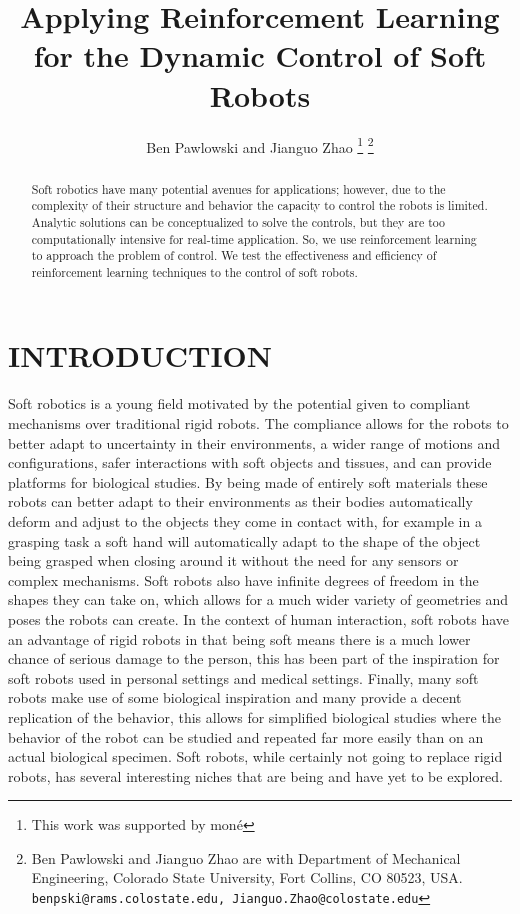 \documentclass[letterpaper, 10 pt, conference]{ieeeconf}  %
\title{\LARGE \bf
Applying Reinforcement Learning for the Dynamic Control of Soft Robots
}
\author{Ben Pawlowski and Jianguo Zhao%
\thanks{This work was supported by mon\'e}%
\thanks{Ben Pawlowski and Jianguo Zhao are with Department of Mechanical Engineering, Colorado State University, Fort Collins, CO 80523, USA.  {\tt\small benpski@rams.colostate.edu,  Jianguo.Zhao@colostate.edu}}%
}
\begin{document}
\maketitle
\thispagestyle{empty}
\pagestyle{empty}


\begin{abstract}

Soft robotics have many potential avenues for applications; however, due to the complexity of their structure and behavior the capacity to control the robots is limited. Analytic solutions can be conceptualized to solve the controls, but they are too computationally intensive for real-time application. So, we use reinforcement learning to approach the problem of control. We test the effectiveness and efficiency of reinforcement learning techniques to the control of soft robots.

\end{abstract}


\section{INTRODUCTION}

Soft robotics is a young field motivated by the potential given to compliant mechanisms over traditional rigid robots. The compliance allows for the robots to better adapt to uncertainty in their environments, a wider range of motions and configurations, safer interactions with soft objects and tissues, and can provide platforms for biological studies. By being made of entirely soft materials these robots can better adapt to their environments as their bodies automatically deform and adjust to the objects they come in contact with, for example in a grasping task a soft hand will automatically adapt to the shape of the object being grasped when closing around it without the need for any sensors or complex mechanisms. Soft robots also have infinite degrees of freedom in the shapes they can take on, which allows for a much wider variety of geometries and poses the robots can create. In the context of human interaction, soft robots have an advantage of rigid robots in that being soft means there is a much lower chance of serious damage to the person, this has been part of the inspiration for soft robots used in personal settings and medical settings. Finally, many soft robots make use of some biological inspiration and many provide a decent replication of the behavior, this allows for simplified biological studies where the behavior of the robot can be studied and repeated far more easily than on an actual biological specimen. Soft robots, while certainly not going to replace rigid robots, has several interesting niches that are being and have yet to be explored.
\end{document}
